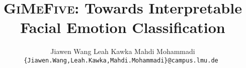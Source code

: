 \documentclass[10pt,twocolumn,letterpaper]{article}
\title{\textsc{GiMeFive}: Towards Interpretable Facial Emotion Classification}
\author{
Jiawen Wang
\qquad
Leah Kawka
\qquad
Mahdi Mohammadi \\
\tt\small\{Jiawen.Wang,Leah.Kawka,Mahdi.Mohammadi\}@campus.lmu.de
}
\begin{document}
\maketitle
    



{
    \small
    
    
}

 
\end{document}
